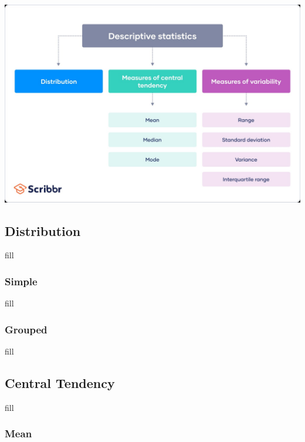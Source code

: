 \documentclass[
  b5paper]{book}
\begin{document}
\href{Descriptive\%20Stats\%20Graphic}{\includegraphics[width=1\textwidth,height=\textheight]{images/desc_stats.jpg}}

\hypertarget{distribution-1}{%
\subsection*{Distribution}\label{distribution-1}}

fill

\hypertarget{simple}{%
\subsubsection*{Simple}\label{simple}}

fill

\hypertarget{grouped}{%
\subsubsection*{Grouped}\label{grouped}}

fill

\hypertarget{central-tendency}{%
\subsection*{Central Tendency}\label{central-tendency}}

fill

\hypertarget{mean}{%
\subsubsection*{Mean}\label{mean}}
\end{document}
